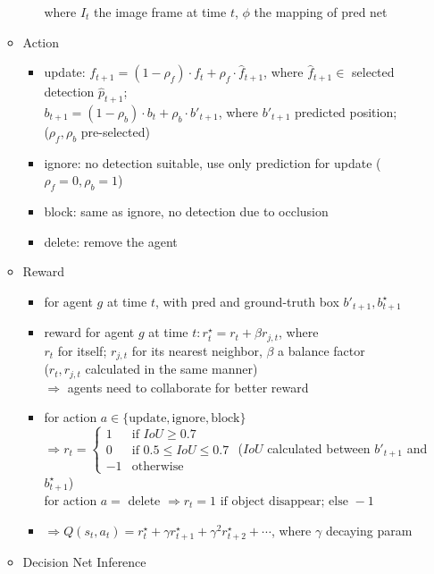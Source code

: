 \begin{itemize}
\begin{itemize}
\begin{itemize}
		where $I_t$ the image frame at time $t$, $\phi$ the mapping of pred net
		\end{itemize}
	\item Action
		\begin{itemize}
		\item update: $f_{t+1}= (1-\rho_f) \cdot f_t + \rho_f \cdot \hat f_{t+1}$, where $\hat f_{t+1} \in$ selected detection $\hat p_{t+1}$; \\
		$b_{t+1} = (1-\rho_b) \cdot b_{t} + \rho_b \cdot b'_{t+1}$, where $b'_{t+1}$ predicted position; \\
		($\rho_f, \rho_b$ pre-selected)
		\item ignore: no detection suitable, use only prediction for update ($\rho_f=0, \rho_b=1$)
		\item block: same as ignore, no detection due to occlusion
		\item delete: remove the agent
		\end{itemize}
	\item Reward
		\begin{itemize}
		\item for agent $g$ at time $t$, with pred and ground-truth box $b'_{t+1}, b^\star_{t+1}$
		\item reward for agent $g$ at time $t: r^\star_{t} = r_t + \beta r_{j,t}$, where \\ 
		$r_t$ for itself; $r_{j,t}$ for its nearest neighbor, $\beta$ a balance factor \\ 
		($r_t,r_{j,t}$ calculated in the same manner) \\
		$\Rightarrow$ agents need to collaborate for better reward
		\item for action $a\in\{\text{update}, \text{ignore}, \text{block}\}$ \\
		$\Rightarrow r_t = \begin{cases}1 & \text{if }IoU \ge 0.7 \\ 0 & \text{if } 0.5 \le IoU \le 0.7 \\ -1 & \text{otherwise} \end{cases}$ ($IoU$ calculated between $b'_{t+1}$ and $b^\star_{t+1}$) \\
		for action $a=$ delete $\Rightarrow r_t = 1 \text{ if object disappear; else } -1$
		\item $\Rightarrow Q(s_t, a_t) = r^\star_{t} + \gamma r^\star_{t+1} + \gamma^2 r^\star_{t+2} + \dotsb$, where $\gamma$ decaying param
		\end{itemize}
	\item Decision Net Inference

\end{itemize}
\end{itemize}
